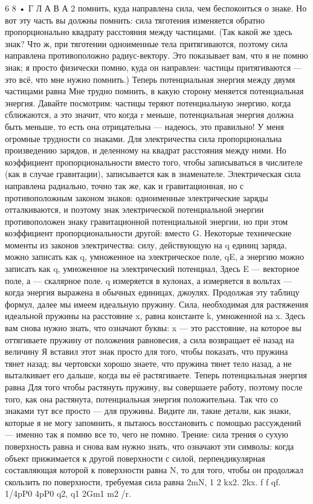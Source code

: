 \documentclass[10pt,oneside]{article}
\begin{document}
6 8 • Г Л А В А  2 помнить, куда направлена сила, чем беспокоиться о знаке. Но вот эту часть вы должны помнить: сила тяготения изменяется обратно пропорционально квадрату расстояния между частицами. (Так какой же здесь знак? Что ж, при тяготении одноименные тела притягиваются, поэтому сила направлена противоположно радиус-вектору. Это показывает вам, что я не помню знак; я просто физически помню, куда он направлен: частицы притягиваются --- это всё, что мне нужно помнить.) Теперь потенциальная энергия между двумя частицами равна Мне трудно помнить, в какую сторону меняется потенциальная энергия. Давайте посмотрим: частицы теряют потенциальную энергию, когда сближаются, а это значит, что когда r меньше, потенциальная энергия должна быть меньше, то есть она отрицательна --- надеюсь, это правильно! У меня огромные трудности со знаками. Для электричества сила пропорциональна произведению зарядов, и деленному на квадрат расстояния между ними. Но коэффициент пропорциональности вместо того, чтобы записываться в числителе (как в случае гравитации), записывается как в знаменателе. Электрическая сила направлена радиально, точно так же, как и гравитационная, но с противоположным законом знаков: одноименные электрические заряды отталкиваются, и поэтому знак электрической потенциальной энергии противоположен знаку гравитационной потенциальной энергии, но при этом коэффициент пропорциональности другой: вместо G. Некоторые технические моменты из законов электричества: силу, действующую на q единиц заряда, можно записать как q, умноженное на электрическое поле, qE, а энергию можно записать как q, умноженное на электрический потенциал, Здесь E --- векторное поле, а --- скалярное поле. q измеряется в кулонах, а измеряется в вольтах --- когда энергия выражена в обычных единицах, джоулях. Продолжая эту таблицу формул, далее мы имеем идеальную пружину. Сила, необходимая для растяжения идеальной пружины на расстояние x, равна константе k, умноженной на x. Здесь вам снова нужно знать, что означают буквы: x --- это расстояние, на которое вы оттягиваете пружину от положения равновесия, а сила возвращает её назад на величину Я вставил этот знак просто для того, чтобы показать, что пружина тянет назад; вы чертовски хорошо знаете, что пружина тянет тело назад, а не выталкивает его дальше, когда вы её растягиваете. Теперь потенциальная энергия равна Для того чтобы растянуть пружину, вы совершаете работу, поэтому после того, как она растянута, потенциальная энергия положительна. Так что со знаками тут все просто --- для пружины. Видите ли, такие детали, как знаки, которые я не могу запомнить, я пытаюсь восстановить с помощью рассуждений --- именно так я помню все то, чего не помню. Трение: сила трения о сухую поверхность равна и снова вам нужно знать, что означают эти символы: когда объект прижимается к другой поверхности с силой, перпендикулярная составляющая которой к поверхности равна N, то для того, чтобы он продолжал скользить по поверхности, требуемая сила равна 2mN, 1 2 kx2. 2kx. f f qf. 1/4pP0 4pP0 q2, q1 2Gm1  m2  /r.\par
\end{document}
